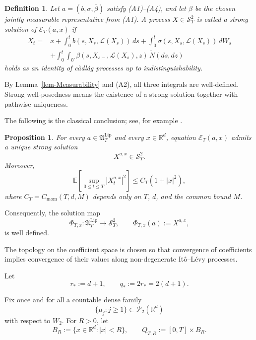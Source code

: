 \documentclass[12pt,oneside, reqno]{amsart}
\newtheorem{definition}[theorem]{Definition}
\newtheorem{proposition}[theorem]{Proposition}
\numberwithin{equation}{section}
\begin{document}
	
	\begin{definition}
		\label{def}
		Let \(a=(b,\sigma,\overline\beta)\) satisfy \textnormal{(A1)}--\textnormal{(A4)}, and let \(\beta\) be the chosen jointly measurable representative from \textnormal{(A1)}. A process \(X\in\mathcal S_T^2\) is called a strong solution of \(\mathcal E_T(a,x)\) if
		\[
		\begin{aligned}
			X_t ={}& x+\int_0^t b(s,X_s,\mathcal L(X_s))\,ds
			+\int_0^t \sigma(s,X_s,\mathcal L(X_s))\,dW_s \\
			&+\int_0^t\int_U \beta(s,X_{s-},\mathcal L(X_s),z)\,\widetilde N(ds,dz)
		\end{aligned}
		\]
		holds as an identity of c\`adl\`ag processes up to indistinguishability.
	\end{definition}
		By Lemma~\ref{lem-Measurability} and \textnormal{(A2)}, all three integrals are well-defined.  Strong well-posedness means the existence of a strong solution together with pathwise uniqueness.
	
	
	The following is the classical conclusion; see, for example \cite{Cavallazzi-2025}.
	\begin{proposition}
		\label{prop:wellposed-core}
		For every $a\in\mathfrak A_T^{\mathrm{Lip}}$ and every	$x\in\mathbb R^d$, equation $\mathcal E_T(a,x)$ admits a unique	strong solution
		\[
		X^{a,x}\in\mathcal S_T^2.
		\]
		Moreover,
		\begin{equation}
			\label{eq:core-moment-bound}
			\mathbb E\left[\sup_{0\leq t\leq T}|X_t^{a,x}|^2\right]
			\leq C_T(1+|x|^2),
		\end{equation}
		where $C_T=C_{\mathrm{mom}}(T,d,M)$ depends only on	$T$, $d$, and the common bound $M$.
	\end{proposition}
	
	Consequently, the solution map
	\begin{equation}
		\label{eq:core-solution-map}
		\Phi_{T,x}:
		\mathfrak A_T^{\mathrm{Lip}}
		\longrightarrow\mathcal S_T^2,
		\qquad
		\Phi_{T,x}(a):=X^{a,x},
	\end{equation}
	is well defined.
	
	
	
	
	The topology on the coefficient space is chosen so that convergence of coefficients implies convergence of their values along non-degenerate It\^o--L\'evy processes.
	
	Let
	\[
	r_\ast:=d+1, \qquad q_\ast:=2r_\ast=2(d+1).
	\]
	
	
	Fix once and for all a countable dense family
	\[
	\{\mu_j:j\geq 1\} \subset\mathcal P_2(\mathbb R^d)
	\]
	with respect to $W_2$. For $R>0$, let
	\[
	B_R:=\{x\in\mathbb R^d:|x|<R\}, \qquad Q_{T,R}:=[0,T]\times B_R.
	\]
	
\end{document}
